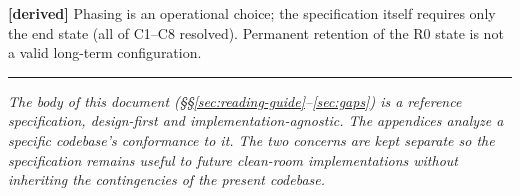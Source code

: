 \documentclass[11pt,a4paper]{article}
\newcommand{\derived}{\textcolor{derivedcolor}{\textbf{[derived]}}\xspace}
\begin{document}
\derived{} Phasing is an operational choice; the specification itself
requires only the end state (all of C1--C8 resolved). Permanent
retention of the R0 state is not a valid long-term configuration.

\vfill
\hrule
\vspace{0.4em}
\noindent\small
\textit{The body of this document (\S\S\ref{sec:reading-guide}--\ref{sec:gaps})
is a reference specification, design-first and implementation-agnostic.
The appendices analyze a specific codebase's conformance to it. The two
concerns are kept separate so the specification remains useful to future
clean-room implementations without inheriting the contingencies of the
present codebase.}
\end{document}
